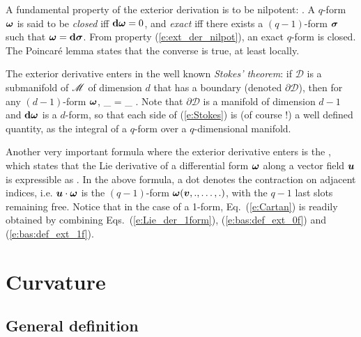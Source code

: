 A fundamental property of the exterior derivation is to be nilpotent:
\be \label{e:ext_der_nilpot}
    .
\ee
A $q$-form $\bm{\omega}$ is said to be \emph{closed} iff $\mathbf{d}\bm{\omega}=0$,
and \emph{exact} iff there exists a $(q-1)$-form $\bm{\sigma}$ such that
$\bm{\omega} = \mathbf{d}\bm{\sigma}$. From property (\ref{e:ext_der_nilpot}),
an exact $q$-form is closed. The Poincar\'e lemma states that the converse is true,
at least locally.

The exterior derivative enters in the well known \emph{Stokes' theorem}: if $\mathcal{D}$
is a submanifold of $\mathscr{M}$ of dimension $d$ that has a boundary (denoted $\partial\mathcal{D}$), then for any $(d-1)$-form $\bm{\omega}$,
\be \label{e:Stokes}
    \oint_{\partial{}} \w{\omega} =
    \int_{} \dd\w{\omega} .
\ee
Note that $\partial\mathcal{D}$ is a manifold of dimension $d-1$ and
$\mathbf{d}\bm{\omega}$ is a $d$-form, so that each side of
(\ref{e:Stokes}) is (of course !) a well defined quantity,
as the integral of a $q$-form over a $q$-dimensional manifold.

Another very important formula where the exterior derivative enters is
the , which states that the
Lie derivative of a differential form
$\bm{\omega}$ along a vector field $\bm{u}$ is expressible as
\be \label{e:Cartan}
    .
\ee
In the above formula, a dot denotes the contraction on adjacent indices, i.e.
$\bm{u}\cdot\bm{\omega}$ is the $(q-1)$-form $\bm{\omega}(\bm{v},.,\ldots,.)$,
with the $q-1$ last slots remaining free. Notice that in
the case of a 1-form, Eq.~(\ref{e:Cartan}) is readily obtained
by combining Eqs.~(\ref{e:Lie_der_1form}),
(\ref{e:bas:def_ext_0f}) and (\ref{e:bas:def_ext_1f}).


\section{Curvature} \label{s:bas:curvat}

\subsection{General definition}

